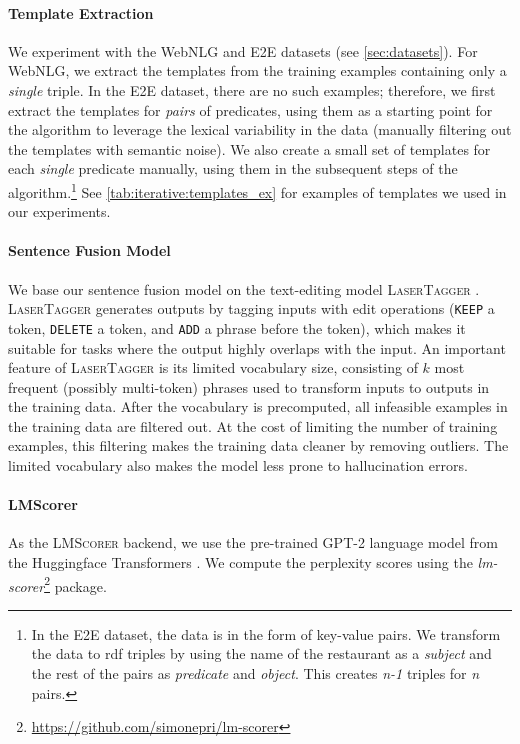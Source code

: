 \paragraph{Template Extraction} We experiment with the WebNLG and E2E datasets (see \autoref{sec:datasets}). For WebNLG, we extract the templates from the training examples containing only a \textit{single} triple. In the E2E dataset, there are no such examples; therefore, we first extract the templates for \textit{pairs} of predicates, using them as a starting point for the algorithm to leverage the lexical variability in the data (manually filtering out the templates with semantic noise). We also create a small set of templates for each \textit{single} predicate manually, using them in the subsequent steps of the algorithm.\footnote{In the E2E dataset, the data is in the form of key-value pairs. We transform the data to \ac{rdf} triples by using the name of the restaurant as a \textit{subject} and the rest of the pairs as \textit{predicate} and \textit{object}. This creates \textit{n-1} triples for \textit{n} pairs.} See \autoref{tab:iterative:templates_ex} for examples of templates we used in our experiments.

\paragraph{Sentence Fusion Model} We base our sentence fusion model on the text-editing model \textsc{LaserTagger} \cite{malmi2019lasertagger}. \textsc{LaserTagger} generates outputs by tagging inputs with edit operations (\texttt{KEEP} a token, \texttt{DELETE} a token, and \texttt{ADD} a phrase before the token), which makes it suitable for tasks where the output highly overlaps with the input. An important feature of \textsc{LaserTagger} is its limited vocabulary size, consisting of $k$ most frequent (possibly multi-token) phrases used to transform inputs to outputs in the training data. After the vocabulary is precomputed, all infeasible examples in the training data are filtered out. At the cost of limiting the number of training examples, this filtering makes the training data cleaner by removing outliers. The limited vocabulary also makes the model less prone to hallucination errors.

\paragraph{LMScorer} As the \textsc{LMScorer} backend, we use the pre-trained GPT-2 language model \citep{radford2019language} from the Huggingface Transformers \citep{wolf2019HuggingFacesTS}. We compute the perplexity scores using the \textit{lm-scorer}\footnote{\url{https://github.com/simonepri/lm-scorer}} package.








